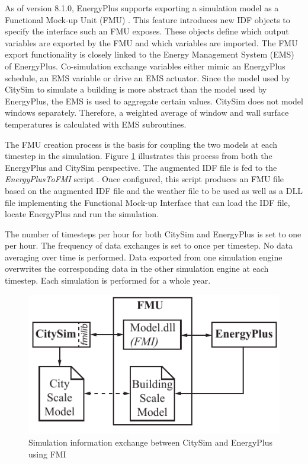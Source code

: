 \documentclass{tBPS2e}
\theoremstyle{plain}
\theoremstyle{definition}
\theoremstyle{remark}
\begin{document}
As of version 8.1.0, EnergyPlus supports exporting a simulation model as a
Functional Mock-up Unit (FMU) \citep{nouidui_functional_2014}. This
feature introduces new IDF objects to specify the interface such an FMU
exposes. These objects define which output variables are exported by the FMU
and which variables are imported. The FMU export functionality is closely
linked to the Energy Management System (EMS) of EnergyPlus. Co-simulation
exchange variables either mimic an EnergyPlus schedule, an EMS variable or
drive an EMS actuator. Since the model used by CitySim to simulate a building
is more abstract than the model used by EnergyPlus, the EMS is used to
aggregate certain values. CitySim does not model windows separately. Therefore,
a weighted average of window and wall surface temperatures is calculated with
EMS subroutines.

The FMU creation process is the basis for coupling the two models at each
timestep in the simulation. Figure \ref{fig:FMUOverview} illustrates this
process from both the EnergyPlus and CitySim perspective. The augmented IDF
file is fed to the \emph{EnergyPlusToFMI} script \citep{nouidui_tool_2014}. Once
configured, this script produces an FMU file based on the augmented IDF file
and the weather file to be used as well as a DLL file implementing the
Functional Mock-up Interface that can load the IDF file, locate EnergyPlus and
run the simulation.

The number of timesteps per hour for both CitySim and EnergyPlus is set to one per hour. 
The frequency of data exchanges is set to once per timestep. No data averaging over time 
is performed. Data exported from one simulation engine overwrites the corresponding data
in the other simulation engine at each timestep. Each simulation is performed for a whole 
year.

\begin{figure}[H]
\centering
\includegraphics[scale=0.7]{figures/UMEM_FMU_Overview}
\caption{Simulation information exchange between CitySim and EnergyPlus using FMI \citep{thomas_multiscale_2014}}
\label{fig:FMUOverview}
\end{figure}
\end{document}
